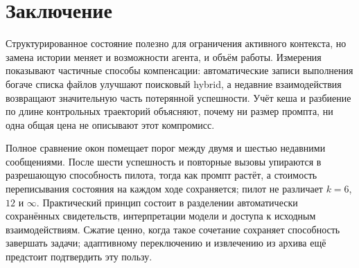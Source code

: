 \section{Заключение}
\label{sec:conclusion}
Структурированное состояние полезно для ограничения активного контекста, но замена истории меняет и возможности агента, и объём работы. Измерения показывают частичные способы компенсации: автоматические записи выполнения богаче списка файлов улучшают поисковый hybrid, а недавние взаимодействия возвращают значительную часть потерянной успешности. Учёт кеша и разбиение по длине контрольных траекторий объясняют, почему ни размер промпта, ни одна общая цена не описывают этот компромисс.

Полное сравнение окон помещает порог между двумя и шестью недавними
сообщениями. После шести успешность и повторные вызовы упираются в
разрешающую способность пилота, тогда как промпт растёт, а стоимость
переписывания состояния на каждом ходе сохраняется; пилот не различает
$k=6$, $12$ и $\infty$. Практический принцип состоит в разделении автоматически сохранённых свидетельств, интерпретации модели и доступа к исходным взаимодействиям. Сжатие ценно, когда такое сочетание сохраняет способность завершать задачи; адаптивному переключению и извлечению из архива ещё предстоит подтвердить эту пользу.
